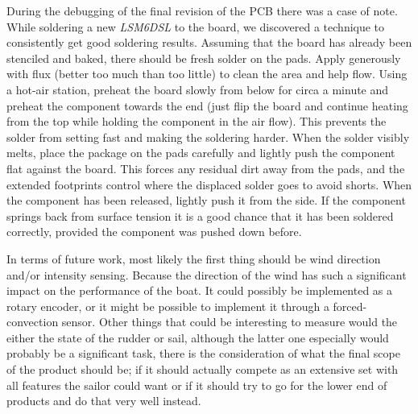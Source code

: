During the debugging of the final revision of the PCB there was a case of note. While soldering a new \emph{LSM6DSL} to the board, we discovered a technique to consistently get good soldering results. Assuming that the board has already been stenciled and baked, there should be fresh solder on the pads. Apply generously with flux (better too much than too little) to clean the area and help flow. Using a hot-air station, preheat the board slowly from below for circa a minute and preheat the component towards the end (just flip the board and continue heating from the top while holding the component in the air flow). This prevents the solder from setting fast and making the soldering harder. When the solder visibly melts, place the package on the pads carefully and lightly push the component flat against the board. This forces any residual dirt away from the pads, and the extended footprints control where the displaced solder goes to avoid shorts. When the component has been released, lightly push it from the side. If the component springs back from surface tension it is a good chance that it has been soldered correctly, provided the component was pushed down before. 

In terms of future work, most likely the first thing should be wind direction and/or intensity sensing. Because the direction of the wind has such a significant impact on the performance of the boat. It could possibly be implemented as a rotary encoder, or it might be possible to implement it through a forced-convection sensor\cite{wind_meas}. Other things that could be interesting to measure would the either the state of the rudder or sail, although the latter one especially would probably be a significant task, there is the consideration of what the final scope of the product should be; if it should actually compete as an extensive set with all features the sailor could want or if it should try to go for the lower end of products and do that very well instead. 

